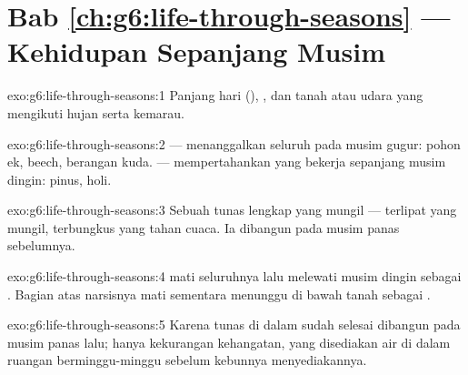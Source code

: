 \section*{Bab \ref{ch:g6:life-through-seasons} --- Kehidupan Sepanjang Musim}

\begin{solution}{exo:g6:life-through-seasons:1}
Panjang hari (), , dan  tanah atau udara yang
mengikuti hujan serta kemarau.
\end{solution}

\begin{solution}{exo:g6:life-through-seasons:2}
 --- menanggalkan seluruh  pada musim gugur: pohon ek,
beech, berangan kuda.  --- mempertahankan  yang
bekerja sepanjang musim dingin: pinus, holi.
\end{solution}

\begin{solution}{exo:g6:life-through-seasons:3}
Sebuah tunas lengkap yang mungil ---  terlipat yang mungil,
terbungkus  yang tahan cuaca. Ia dibangun pada musim panas
sebelumnya.
\end{solution}

\begin{solution}{exo:g6:life-through-seasons:4}
 mati seluruhnya lalu melewati musim dingin sebagai
. Bagian atas  narsisnya mati sementara  menunggu
di bawah tanah sebagai .
\end{solution}

\begin{solution}{exo:g6:life-through-seasons:5}
Karena tunas di dalam  sudah selesai dibangun pada musim
panas lalu;  hanya kekurangan kehangatan, yang disediakan
air di dalam ruangan berminggu-minggu sebelum kebunnya menyediakannya.
\end{solution}


